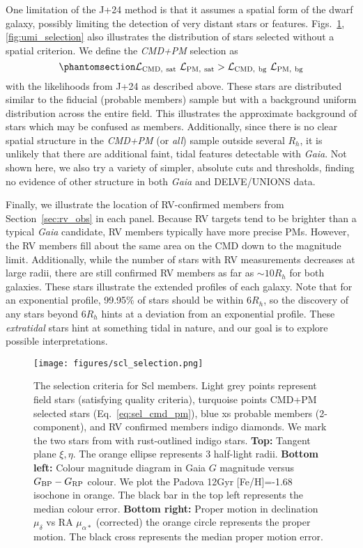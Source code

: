 One limitation of the J+24 method is that it assumes a spatial form of
the dwarf galaxy, possibly limiting the detection of very distant stars
or features. Figs.~\ref{fig:scl_selection}, \ref{fig:umi_selection} also
illustrates the distribution of stars selected without a spatial
criterion. We define the \emph{CMD+PM} selection as
\begin{equation}\protect\phantomsection\label{eq:sel_cmd_pm}{
{\cal L}_{\rm CMD,\ sat}\ {\cal L}_{\rm PM,\ sat} > {\cal L}_{\rm CMD,\ bg}\ {\cal L}_{\rm PM,\ bg}
}\end{equation} with the likelihoods from J+24 as described above. These
stars are distributed similar to the fiducial (probable members) sample
but with a background uniform distribution across the entire field. This
illustrates the approximate background of stars which may be confused as
members. Additionally, since there is no clear spatial structure in the
\emph{CMD+PM} (or \emph{all}) sample outside several \(R_h\), it is
unlikely that there are additional faint, tidal features detectable with
\emph{Gaia}. Not shown here, we also try a variety of simpler, absolute
cuts and thresholds, finding no evidence of other structure in both
\emph{Gaia} and DELVE/UNIONS data.

Finally, we illustrate the location of RV-confirmed members from
Section~\ref{sec:rv_obs} in each panel. Because RV targets tend to be
brighter than a typical \emph{Gaia} candidate, RV members typically have
more precise PMs. However, the RV members fill about the same area on
the CMD down to the magnitude limit. Additionally, while the number of
stars with RV measurements decreases at large radii, there are still
confirmed RV members as far as \(\sim 10R_h\) for both galaxies. These
stars illustrate the extended profiles of each galaxy. Note that for an
exponential profile, 99.95\% of stars should be within \(6R_h\), so the
discovery of any stars beyond \(6R_h\) hints at a deviation from an
exponential profile. These \emph{extratidal} stars hint at something
tidal in nature, and our goal is to explore possible interpretations.

\begin{figure}
\centering
\texttt{[image: figures/scl\_selection.png]}
\caption[Sculptor sample selection]{The selection criteria for Scl
members. Light grey points represent field stars (satisfying quality
criteria), turquoise points CMD+PM selected stars
(Eq.~\ref{eq:sel_cmd_pm}), blue xs probable members (2-component), and
RV confirmed members indigo diamonds. We mark the two stars from
\citet{sestito+2023a} with rust-outlined indigo stars. \textbf{Top:}
Tangent plane \(\xi, \eta\). The orange ellipse represents 3 half-light
radii. \textbf{Bottom left:} Colour magnitude diagram in Gaia \(G\)
magnitude versus \(G_{\rm BP} - G_{\rm RP}\) colour. We plot the Padova
12Gyr {[}Fe/H{]}=-1.68 isochone in orange. The black bar in the top left
represents the median colour error. \textbf{Bottom right:} Proper motion
in declination \(\mu_\delta\) vs RA \(\mu_{\alpha*}\) (corrected) the
orange circle represents the \citet{MV2020b} proper motion. The black
cross represents the median proper motion
error.}\label{fig:scl_selection}
\end{figure}

